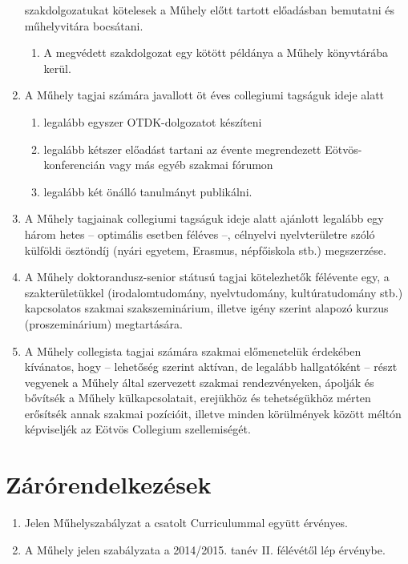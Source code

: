 \documentclass{../styles/rulebook}
\begin{document}
\begin{enumerate}
	szakdolgozatukat kötelesek a Műhely előtt tartott előadásban bemutatni és
	műhelyvitára bocsátani. 
	\begin{enumerate}
		\item A megvédett szakdolgozat egy kötött példánya a Műhely könyvtárába kerül.
	\end{enumerate}
	\item A Műhely tagjai számára javallott öt éves collegiumi tagságuk
	ideje alatt 
	\begin{enumerate}
		\item legalább egyszer OTDK-dolgozatot készíteni 
		\item legalább kétszer előadást tartani az évente megrendezett Eötvös-konferencián vagy más egyéb szakmai fórumon
		\item legalább két önálló tanulmányt publikálni.
	\end{enumerate}
	\item A Műhely tagjainak collegiumi tagságuk ideje alatt ajánlott legalább egy három hetes -- optimális esetben féléves --, célnyelvi nyelvterületre szóló külföldi ösztöndíj (nyári egyetem, Erasmus, népfőiskola stb.) megszerzése.
	\item A Műhely doktorandusz-senior státusú tagjai kötelezhetők félévente egy, a szakterületükkel (irodalomtudomány, nyelvtudomány, kultúratudomány stb.) kapcsolatos szakmai szakszeminárium, illetve igény szerint alapozó kurzus (proszeminárium) megtartására.
	\item A Műhely collegista tagjai számára szakmai előmenetelük
	érdekében kívánatos, hogy -- lehetőség szerint aktívan, de legalább hallgatóként -- részt vegyenek a Műhely által szervezett szakmai rendezvényeken, ápolják és bővítsék a Műhely külkapcsolatait, erejükhöz és tehetségükhöz mérten erősítsék annak szakmai pozícióit, illetve minden körülmények között méltón képviseljék az Eötvös Collegium szellemiségét.
\end{enumerate}


\section{Zárórendelkezések}

\begin{enumerate}
	\item Jelen Műhelyszabályzat a csatolt Curriculummal együtt érvényes.
	\item A Műhely jelen szabályzata a 2014/2015. tanév II. félévétől lép érvénybe.
\end{enumerate}
\end{document}
